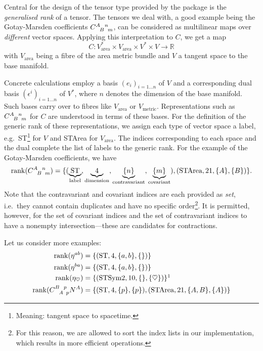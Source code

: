 Central for the design of the tensor type provided by the package is the \emph{generalised rank} of a tensor. The tensors we deal with, a good example being the Gotay-Marsden coefficients $\gmc{A}{B}{n}{m}$, can be considered as multilinear maps over \emph{different} vector spaces. Applying this interpretation to $C$, we get a map
\begin{equation}
  C \colon V_\text{area}^\ast \times V_\text{area} \times V^\ast \times V \rightarrow \mathbb R
\end{equation}
with $V_\text{area}$ being a fibre of the area metric bundle and $V$ a tangent space to the base manifold.

Concrete calculations employ a basis $(e_i)_{i=1\dots n}$ of $V$ and a corresponding dual basis $(\epsilon^i)_{i=1\dots n}$ of $V^\ast$, where $n$ denotes the dimension of the base manifold. Such bases carry over to fibres like $V_\text{area}$ or $V_\text{metric}$. Representations such as $\gmc{A}{B}{n}{m}$ for $C$ are understood in terms of these bases. For the definition of the generic rank of these representations, we assign each type of vector space a label, e.g.\ ST\footnote{Meaning: tangent space to spacetime.} for $V$ and STArea for $V_\text{area}$. The indices corresponding to each space and the dual complete the list of labels to the generic rank. For the example of the Gotay-Marsden coefficients, we have
\begin{equation}
  \operatorname{rank}(\gmc{A}{B}{n}{m}) = \{(\underbrace{\text{ST}}_{\text{label}}, \underbrace{4}_{\text{dimension}}, \underbrace{\{n\}}_{\text{contravariant}}, \underbrace{\{m\}}_{\text{covariant}}), (\text{STArea}, 21, \{A\}, \{B\})\}.
\end{equation}
Note that the contravariant and covariant indices are each provided as \emph{set}, i.e.\ they cannot contain duplicates and have no specific order\footnote{For this reason, we are allowed to sort the index lists in our implementation, which results in more efficient operations.}. It is permitted, however, for the set of covariant indices and the set of contravariant indices to have a nonempty intersection---these are candidates for contractions.

Let us consider more examples:
\begin{align}
  \operatorname{rank}(\eta^{ab}) = {} & \{(\text{ST}, 4, \{a,b\}, \{\})\} \\
  \operatorname{rank}(\eta^{ba}) = {} & \{(\text{ST}, 4, \{a,b\}, \{\})\} \\
  \operatorname{rank}(\eta_{\heartsuit}) = {} & \{(\text{STSym2}, 10, \{\}, \{\heartsuit\})\}\footnotemark \\
  \operatorname{rank}(\gmc{B}{A}{p}{p} N^A) = {} & \{(\text{ST}, 4, \{p\}, \{p\}), (\text{STArea}, 21, \{A,B\}, \{A\})\} \label{eq_to_contract}
\end{align}

